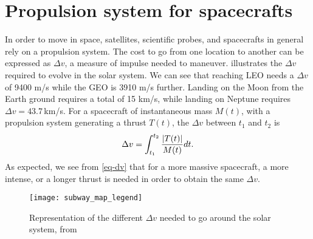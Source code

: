 


\section{Propulsion system for spacecrafts}
\label{sec-propulsion}


In order to move in space, satellites, scientific probes, and spacecrafts in general rely on a propulsion system.
The cost to go from one location to another can be expressed as $\Delta v$, a measure of impulse needed to maneuver.
 illustrates the $\Delta v$ required to evolve in the solar system.
We can see that reaching \ac{LEO} needs a $\Delta v$ of 9400 m/s while the \ac{GEO} is 3910 m/s further.
Landing on the Moon from the Earth ground requires a total of 15 km/s, while landing on Neptune requires $\Delta v =43.7$\,km/s.
For a spacecraft of instantaneous mass $M(t)$, with a propulsion system generating a thrust $T(t)$, the $\Delta v$ between $t_1$ and $t_2$ is
\begin{equation} \label{eq-dv}
  \Delta v = \int_{t_1}^{t_2} \frac{ \lvert T(t)\rvert}{M(t)} dt.
\end{equation}
As expected, we see from \cref{eq-dv} that for a more massive spacecraft, a more intense, or a longer thrust is needed in order to obtain the same $\Delta v$.
\begin{figure}[!hbt]
  \centering
  \texttt{[image: subway\_map\_legend]}
  \caption{Representation of the different $\Delta v$ needed to go around the solar system, from \citet{reddit-subway}}
  \label{fig-subway_DV}
\end{figure}

